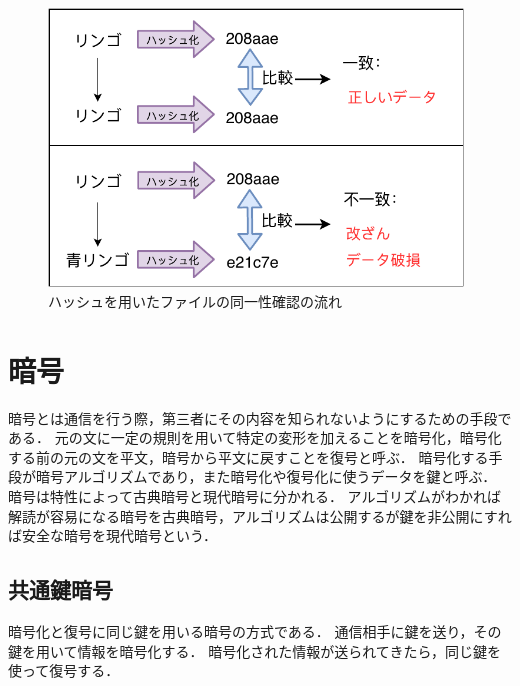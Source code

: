\documentclass[a4j,12pt]{jsarticle}
\begin{document}
\begin{figure}[H]
\centering
\includegraphics[width=11cm]{hash.pdf}
\caption{ハッシュを用いたファイルの同一性確認の流れ}
\label{fig:no}
\end{figure} 




\section{暗号}
暗号とは通信を行う際，第三者にその内容を知られないようにするための手段である．
元の文に一定の規則を用いて特定の変形を加えることを暗号化，暗号化する前の元の文を平文，暗号から平文に戻すことを復号と呼ぶ．
暗号化する手段が暗号アルゴリズムであり，また暗号化や復号化に使うデータを鍵と呼ぶ．
暗号は特性によって古典暗号と現代暗号に分かれる．
アルゴリズムがわかれば解読が容易になる暗号を古典暗号，アルゴリズムは公開するが鍵を非公開にすれば安全な暗号を現代暗号という．

\newpage
\subsection{共通鍵暗号}
暗号化と復号に同じ鍵を用いる暗号の方式である．
通信相手に鍵を送り，その鍵を用いて情報を暗号化する．
暗号化された情報が送られてきたら，同じ鍵を使って復号する．
\end{document}
